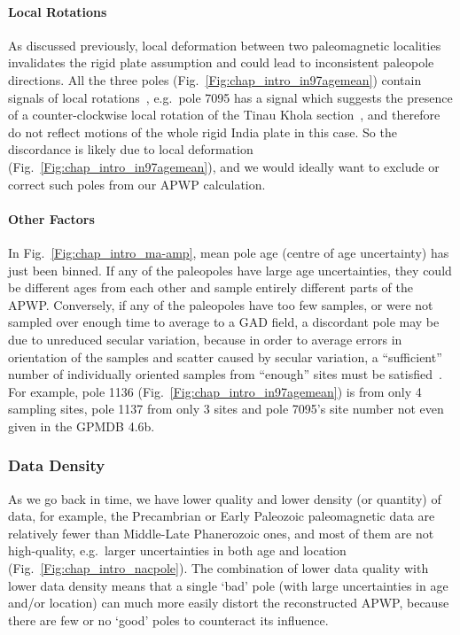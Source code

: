 \paragraph{Local Rotations}

As discussed previously, local deformation between two paleomagnetic localities
invalidates the rigid plate assumption and could lead to inconsistent paleopole
directions. All the three poles (Fig.~\ref{Fig:chap_intro_in97agemean})
contain signals of local rotations~\citep{O82,G94}, e.g.\ pole 7095 has a signal
which suggests the presence of a counter-clockwise local rotation of the Tinau
Khola section~\citep{G94}, and therefore do not reflect motions of the whole
rigid India plate in this case. So the discordance is likely due to local
deformation (Fig.~\ref{Fig:chap_intro_in97agemean}), and we would ideally
want to exclude or correct such poles from our APWP calculation.

\paragraph{Other Factors}

In Fig.~\ref{Fig:chap_intro_ma-amp}, mean pole age (centre of age uncertainty)
has just been binned. If any of the paleopoles have large age uncertainties,
they could be different ages from each other and sample entirely different parts
of the APWP\@. Conversely, if any of the paleopoles have too few samples, or
were not sampled over enough time to average to a GAD field, a discordant pole
may be due to unreduced secular variation, because in order to average errors in
orientation of the samples and scatter caused by secular variation, a
``sufficient'' number of individually oriented samples from ``enough'' sites
must be satisfied~\citep{T19,v90,B02}. For example, pole 1136
(Fig.~\ref{Fig:chap_intro_in97agemean}) is from only 4 sampling sites, pole 1137
from only 3 sites and pole 7095's site number not even given in the GPMDB 4.6b.

\subsubsection{Data Density}\label{sec:datden}

As we go back in time, we have lower quality and lower density (or quantity) of
data, for example, the Precambrian or Early Paleozoic paleomagnetic data are
relatively fewer than Middle-Late Phanerozoic ones, and most of them are not
high-quality, e.g.\ larger uncertainties in both age and location
(Fig.~\ref{Fig:chap_intro_nacpole}). The combination of lower data quality with
lower data density means that a single `bad' pole (with large uncertainties in
age and/or location) can much more easily distort the reconstructed APWP,
because there are few or no `good' poles to counteract its influence.

